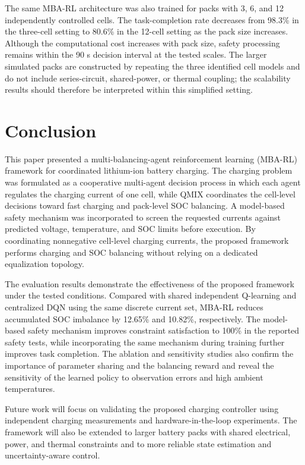 \documentclass[10pt,journal,letterpaper]{IEEEtran}
\begin{document}
The same MBA-RL architecture was also trained for packs with 3, 6, and 12 independently controlled cells. The task-completion rate decreases from 98.3\% in the three-cell setting to 80.6\% in the 12-cell setting as the pack size increases. Although the computational cost increases with pack size, safety processing remains within the 90 s decision interval at the tested scales. The larger simulated packs are constructed by repeating the three identified cell models and do not include series-circuit, shared-power, or thermal coupling; the scalability results should therefore be interpreted within this simplified setting.

\section{Conclusion}

This paper presented a multi-balancing-agent reinforcement learning (MBA-RL) framework for coordinated lithium-ion battery charging. The charging problem was formulated as a cooperative multi-agent decision process in which each agent regulates the charging current of one cell, while QMIX coordinates the cell-level decisions toward fast charging and pack-level SOC balancing. A model-based safety mechanism was incorporated to screen the requested currents against predicted voltage, temperature, and SOC limits before execution. By coordinating nonnegative cell-level charging currents, the proposed framework performs charging and SOC balancing without relying on a dedicated equalization topology.

The evaluation results demonstrate the effectiveness of the proposed framework under the tested conditions. Compared with shared independent Q-learning and centralized DQN using the same discrete current set, MBA-RL reduces accumulated SOC imbalance by 12.65\% and 10.82\%, respectively. The model-based safety mechanism improves constraint satisfaction to 100\% in the reported safety tests, while incorporating the same mechanism during training further improves task completion. The ablation and sensitivity studies also confirm the importance of parameter sharing and the balancing reward and reveal the sensitivity of the learned policy to observation errors and high ambient temperatures.

Future work will focus on validating the proposed charging controller using independent charging measurements and hardware-in-the-loop experiments. The framework will also be extended to larger battery packs with shared electrical, power, and thermal constraints and to more reliable state estimation and uncertainty-aware control.
\end{document}
